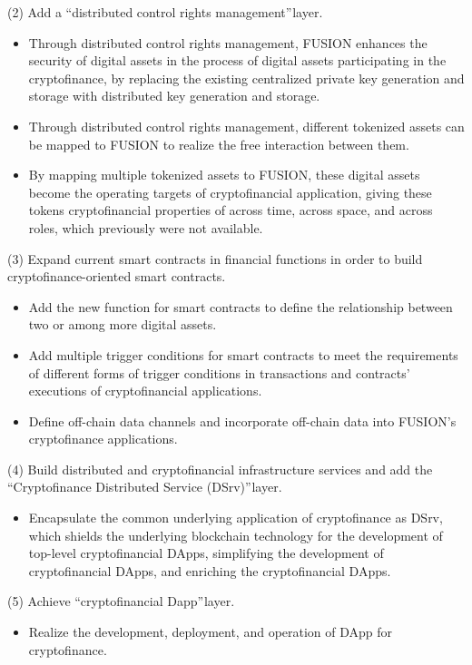 \documentclass[a4paper,12pt]{article}
\begin{document}
(2) Add a “distributed control rights management” layer.
\begin{itemize} [itemindent = 1em]
\item Through distributed control rights management, FUSION enhances the security of digital assets in the process of digital assets participating in the cryptofinance, by replacing the existing centralized private key generation and storage with distributed key generation and storage.
\item Through distributed control rights management, different tokenized assets can be mapped to FUSION to realize the free interaction between them.
\item By mapping multiple tokenized assets to FUSION, these digital assets become the operating targets of cryptofinancial application, giving these tokens cryptofinancial properties of across time, across space, and across roles, which previously were not available.
\end{itemize}

(3) Expand current smart contracts in financial functions in order to build cryptofinance-oriented smart contracts.
\begin{itemize} [itemindent = 1em]
\item Add the new function for smart contracts to define the relationship between two or among more digital assets.
\item Add multiple trigger conditions for smart contracts to meet the requirements of different forms of trigger conditions in transactions and contracts' executions of cryptofinancial applications.
\item Define off-chain data channels and incorporate off-chain data into FUSION's cryptofinance applications.
\end{itemize}

(4) Build distributed and cryptofinancial infrastructure services and add the “Cryptofinance Distributed Service (DSrv)” layer.
\begin{itemize} [itemindent = 1em]
\item Encapsulate the common underlying application of cryptofinance as DSrv, which shields the underlying blockchain technology for the development of top-level cryptofinancial DApps, simplifying the development of cryptofinancial DApps, and enriching the cryptofinancial DApps.
\end{itemize}

(5) Achieve “cryptofinancial Dapp” layer.
\begin{itemize} [itemindent = 1em]
\item Realize the development, deployment, and operation of DApp for cryptofinance.
\end{itemize}
\end{document}
